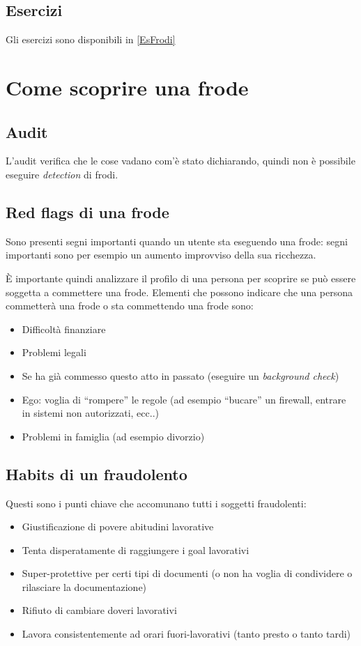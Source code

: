 \subsection{Esercizi}

Gli esercizi sono disponibili in \ref{EsFrodi}

\section{Come scoprire una frode}

\subsection{Audit}

L'audit verifica che le cose vadano com'è stato dichiarando, quindi non è
possibile eseguire \textit{detection} di frodi.

\subsection{Red flags di una frode}
Sono presenti segni importanti quando un utente sta eseguendo una frode: segni
importanti sono per esempio un aumento improvviso della sua ricchezza.

È importante quindi analizzare il profilo di una persona per scoprire se può
essere soggetta a commettere una frode. Elementi che possono indicare che una
persona commetterà una frode o sta commettendo una frode sono:
\begin{itemize}
  \item Difficoltà finanziare
  \item Problemi legali
  \item Se ha già commesso questo atto in passato (eseguire un
  \textit{background check})
  \item Ego: voglia di ``rompere'' le regole (ad esempio ``bucare'' un
  firewall, entrare in sistemi non autorizzati, ecc..)
  \item Problemi in famiglia (ad esempio divorzio)
\end{itemize}

\subsection{Habits di un fraudolento}

Questi sono i punti chiave che accomunano tutti i soggetti fraudolenti:
\begin{itemize}
  \item Giustificazione di povere abitudini lavorative
  \item Tenta disperatamente di raggiungere i goal lavorativi
  \item Super-protettive per certi tipi di documenti (o non ha voglia di
  condividere o rilasciare la documentazione)
  \item Rifiuto di cambiare doveri lavorativi
  \item Lavora consistentemente ad orari fuori-lavorativi (tanto presto o tanto
  tardi)
\end{itemize}

